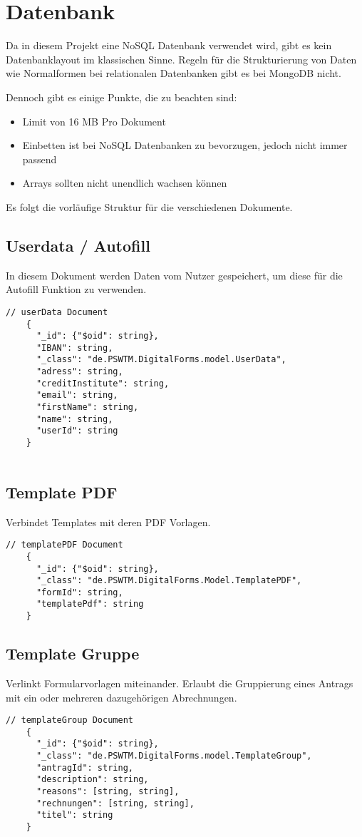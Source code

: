 \chapter{Datenbank}
Da in diesem Projekt eine NoSQL Datenbank verwendet wird, gibt es kein Datenbanklayout im klassischen Sinne.
Regeln für die Strukturierung von Daten wie Normalformen bei relationalen Datenbanken gibt es bei MongoDB nicht.

Dennoch gibt es einige Punkte, die zu beachten sind:
\begin{itemize}
    \item Limit von 16 \ac{MB} Pro Dokument
    \item Einbetten ist bei NoSQL Datenbanken zu bevorzugen, jedoch nicht immer passend
    \item Arrays sollten nicht unendlich wachsen können
\end{itemize}

Es folgt die vorläufige Struktur für die verschiedenen Dokumente.

\section{Userdata / Autofill}
In diesem Dokument werden Daten vom Nutzer gespeichert, um diese für die Autofill Funktion zu verwenden.
\begin{lstlisting}[label={lst:lstlistingusers}]
    // userData Document
    {
      "_id": {"$oid": string},
      "IBAN": string,
      "_class": "de.PSWTM.DigitalForms.model.UserData",
      "adress": string,
      "creditInstitute": string,
      "email": string,
      "firstName": string,
      "name": string,
      "userId": string
    }


\end{lstlisting}

\section{Template PDF}
Verbindet Templates mit deren PDF Vorlagen.
\begin{lstlisting}[label={lst:lstlistingauto}]
    // templatePDF Document
    {
      "_id": {"$oid": string},
      "_class": "de.PSWTM.DigitalForms.Model.TemplatePDF",
      "formId": string,
      "templatePdf": string
    }

\end{lstlisting}

\section{Template Gruppe}
Verlinkt Formularvorlagen miteinander.
Erlaubt die Gruppierung eines Antrags mit ein oder mehreren dazugehörigen Abrechnungen.
\begin{lstlisting}[label={lst:templateGroup}]
    // templateGroup Document
    {
      "_id": {"$oid": string},
      "_class": "de.PSWTM.DigitalForms.model.TemplateGroup",
      "antragId": string,
      "description": string,
      "reasons": [string, string],
      "rechnungen": [string, string],
      "titel": string
    }

\end{lstlisting}


